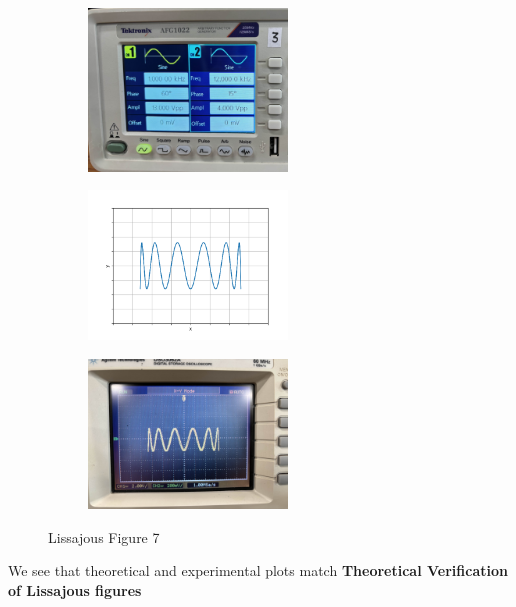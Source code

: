 \documentclass[a4paper,12pt]{article}
\begin{document}
\begin{figure}[h!]
	\begin{subfigure}[b]{10pt}
		\includegraphics[width = 150pt]{figs/fig7.jpeg}
	\end{subfigure}
	\hspace{120pt}
	\begin{subfigure}[b]{10pt}
		\includegraphics[width = 150pt]{figs/fig7.png}
	\end{subfigure}
	\hspace{130pt}
	\begin{subfigure}[b]{10pt}
		\includegraphics[width = 150pt]{figs/fig7_1.jpeg}
	\end{subfigure}
	\caption{Lissajous Figure 7}
\end{figure}

We see that theoretical and experimental plots match\newline
\textbf{Theoretical Verification of Lissajous figures}


\noindent{}
\end{document}
